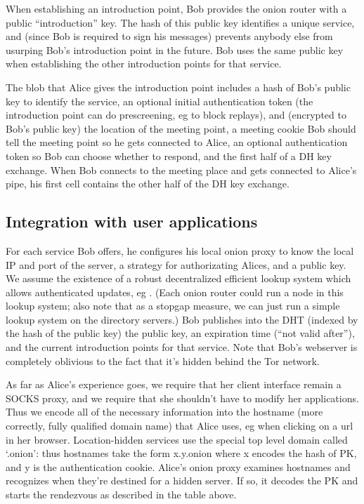 \documentclass[times,10pt,twocolumn]{article}
\begin{document}
When establishing an introduction point, Bob provides the onion router
with a public ``introduction'' key.  The hash of this public key
identifies a unique service, and (since Bob is required to sign his
messages) prevents anybody else from usurping Bob's introduction point
in the future. Bob uses the same public key when establishing the other
introduction points for that service.

The blob that Alice gives the introduction point includes a hash of Bob's
public key to identify the service, an optional initial authentication
token (the introduction point can do prescreening, eg to block replays),
and (encrypted to Bob's public key) the location of the meeting point,
a meeting cookie Bob should tell the meeting point so he gets connected to
Alice, an optional authentication token so Bob can choose whether to respond,
and the first half of a DH key exchange. When Bob connects to the meeting
place and gets connected to Alice's pipe, his first cell contains the
other half of the DH key exchange.


\subsection{Integration with user applications}

For each service Bob offers, he configures his local onion proxy to know
the local IP and port of the server, a strategy for authorizating Alices,
and a public key. We assume the existence of a robust decentralized
efficient lookup system which allows authenticated updates, eg
\cite{cfs:sosp01}. (Each onion router could run a node in this lookup
system; also note that as a stopgap measure, we can just run a simple
lookup system on the directory servers.)  Bob publishes into the DHT
(indexed by the hash of the public key) the public key, an expiration
time (``not valid after''), and the current introduction points for that
service. Note that Bob's webserver is completely oblivious to the fact
that it's hidden behind the Tor network.

As far as Alice's experience goes, we require that her client interface
remain a SOCKS proxy, and we require that she shouldn't have to modify
her applications. Thus we encode all of the necessary information into
the hostname (more correctly, fully qualified domain name) that Alice
uses, eg when clicking on a url in her browser. Location-hidden services
use the special top level domain called `.onion': thus hostnames take the
form x.y.onion where x encodes the hash of PK, and y is the authentication
cookie. Alice's onion proxy examines hostnames and recognizes when they're
destined for a hidden server. If so, it decodes the PK and starts the
rendezvous as described in the table above.
\end{document}
